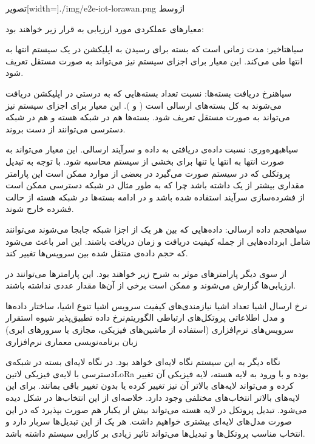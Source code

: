 ‌تصویر[width=\textwidth]{./img/e2e-iot-lorawan.png}
‌ازوسط

معیار‌های عملکردی مورد ارزیابی به قرار زیر خواهند بود:


 ‌سیاه{تاخیر}: مدت زمانی است که بسته برای رسیدن به اپلیکشن در یک سیستم انتها به انتها طی می‌کند. این معیار برای
اجزای سیستم نیز می‌تواند به صورت مستقل تعریف شود.

 ‌سیاه{نرخ دریافت بسته‌ها}: نسبت تعداد بسته‌هایی که به درستی در اپلیکشن دریافت می‌شوند به کل بسته‌های ارسالی است ( و ).
این معیار برای اجزای سیستم
نیز می‌تواند به صورت مستقل تعریف شود. بسته‌ها هم در شبکه هسته و هم در شبکه دسترسی می‌توانند از دست بروند.

 ‌سیاه{بهره‌وری}: نسبت داده‌ی دریافتی به داده و سرآیند ارسالی. این معیار می‌تواند به صورت انتها به انتها یا تنها برای بخشی
از سیستم محاسبه شود. با توجه به تبدیل پروتکلی که در سیستم صورت می‌گیرد در بعضی از موارد ممکن است این پارامتر مقداری
بیشتر از یک داشته باشد چرا که به طور مثال در شبکه دسترسی ممکن است از فشرده‌سازی سرآیند استفاده شده باشد و در ادامه بسته‌ها در شبکه هسته
از حالت فشرده خارج شوند.

 ‌سیاه{حجم داده ارسالی}: داده‌هایی که بین هر یک از اجزا شبکه جابجا می‌شوند می‌توانند شامل ابرداده‌هایی از جمله
کیفیت دریافت و زمان دریافت باشند. این امر باعث می‌شود که حجم داده‌ی منتقل شده بین سرویس‌ها تغییر کند.


از سوی دیگر پارامترهای موثر به شرح زیر خواهند بود. این پارامترها می‌توانند در ارزیابی‌ها گزارش می‌شوند و ممکن است برخی از آن‌ها
مقدار عددی نداشته باشند.

 نرخ ارسال اشیا
 تعداد اشیا
 نیازمندی‌های کیفیت سرویس اشیا
 تنوع اشیا، ساختار داده‌ها و مدل اطلاعاتی
 پروتکل‌های ارتباطی
 الگوریتم‌نرخ داده تطبیق‌پذیر
 شیوه استقرار سرویس‌های نرم‌افزاری (استفاده از ماشین‌های فیزیکی، مجازی یا سرورهای ابری)
 زبان برنامه‌نویسی
 معماری نرم‌افزاری

نگاه دیگر به این سیستم نگاه لایه‌ای خواهد بود. در نگاه لایه‌ای بسته در شبکه‌ی دسترسی با لایه‌ی فیزیکی ‌لاتین{LoRa} بوده و با ورود به لایه هسته،
لایه فیزیکی آن تغییر کرده و می‌تواند لایه‌های بالاتر آن نیز تغییر کرده یا بدون تغییر باقی بمانند. برای این لایه‌های بالاتر انتخاب‌های مختلفی وجود دارد.
خلاصه‌ای از این انتخاب‌ها در شکل  دیده می‌شود.
تبدیل پروتکل در لایه هسته می‌تواند بیش از یکبار هم صورت بپذیرد که در این صورت مدل‌های لایه‌ای بیشتری خواهیم داشت. هر یک از این تبدیل‌ها
سربار دارد و انتخاب مناسب پروتکل‌ها و تبدیل‌ها می‌تواند تاثیر زیادی بر کارایی سیستم داشته باشد.

